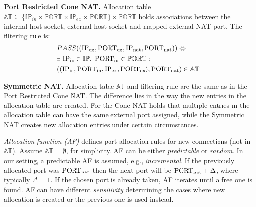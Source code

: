 \documentclass{acm_proc_article-sp}
\begin{document}
\par\smallskip
\noindent\textbf{Port Restricted Cone NAT.} 
Allocation table $\mathbb{AT} \subseteq \{\mathbb{IP}_{in} \times \mathbb{PORT} \times \mathbb{IP}_{ex} \times \mathbb{PORT}\} \times \mathbb{PORT}$ 
holds associations between the internal host socket, external host socket and mapped external NAT port. 
The filtering rule is:
\begin{align*}
& PASS((\text{IP\textsubscript{ex}}, \text{PORT\textsubscript{ex}}, \text{IP\textsubscript{nat}}, \text{PORT\textsubscript{nat}} )) \Leftrightarrow \\
&  \exists \; \text{IP\textsubscript{in}} \in \mathbb{IP}, \; \text{PORT\textsubscript{in}} \in \mathbb{PORT}:\\
& ((\text{IP\textsubscript{in}}, \text{PORT\textsubscript{in}}, \text{IP\textsubscript{ex}}, \text{PORT\textsubscript{ex}}), \text{PORT\textsubscript{nat}} ) \in \mathbb{AT}
\end{align*}

\par\smallskip
\noindent\textbf{Symmetric NAT.} 
Allocation table $\mathbb{AT}$ and filtering rule are the same as in the Port Restricted Cone NAT. The difference lies in the way 
the new entries in the allocation table are created. For the Cone NAT holds that multiple entries in the allocation table 
can have the same external port assigned, while the Symmetric NAT creates new allocation entries under certain circumstances.

\emph{Allocation function (AF)} defines port allocation rules for new connections (not in $\mathbb{AT}$). Assume $\mathbb{AT}=\emptyset$, for simplicity. 
AF can be either \emph{predictable} or \emph{random}. In our setting, a predictable AF is assumed, e.g., \emph{incremental}. 
If the previously allocated port was $\text{PORT\textsubscript{nat}}$ then
the next port will be $\text{PORT\textsubscript{nat}}+\Delta$, where typically $\Delta=1$.
If the chosen port is already taken, AF iterates until a free one is found.
AF can have different \emph{sensitivity} determining the cases where new allocation is created or the previous one is used instead.
\end{document}
